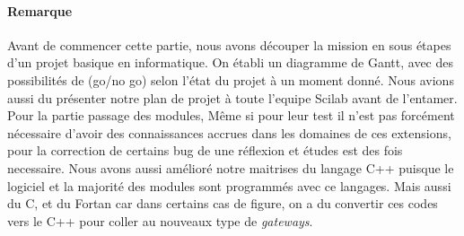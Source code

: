 \paragraph{Remarque}
Avant de commencer cette partie, nous avons découper la mission en sous étapes d'un projet basique en
informatique. On établi un diagramme de Gantt, avec des possibilités de (go/no go) selon l'état du projet à
un moment donné. Nous avions aussi du présenter notre plan de projet à toute l'equipe Scilab avant de l'entamer. \newline
Pour la partie passage des modules, Même si pour leur test il n'est pas forcément nécessaire d'avoir
des connaissances accrues dans les domaines de ces extensions, pour la correction de certains
bug de une réflexion et études est des fois  necessaire.
Nous avons aussi amélioré notre maitrises du langage  C++ puisque le logiciel et la majorité des modules
sont programmés avec ce langages. Mais aussi du C, et du Fortan car dans certains cas de figure, on a du convertir ces codes
vers le C++ pour coller au nouveaux type de {\it gateways}.

